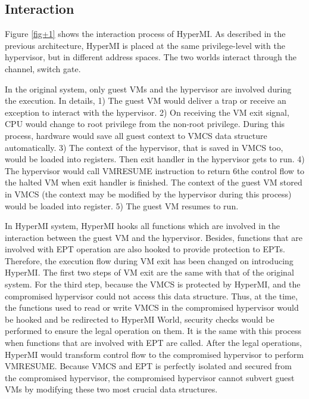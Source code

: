 \documentclass[conference]{IEEEtran}
\begin{document}
\iffalse
\subsection{Interaction} \label{IN}


Figure \ref{fig+1} shows the interaction process of HyperMI. 
As described in the previous architecture, HyperMI is placed at the same privilege-level with the hypervisor, but in different address spaces. The two worlds interact through the channel, switch gate.


In the original system, only guest VMs and the hypervisor are involved during the execution. In details, 1) The guest VM would deliver a trap or receive an exception to interact with the hypervisor. 2) On receiving the VM exit signal, CPU would change to root privilege from the non-root privilege. During this process, hardware would save all guest context to VMCS data structure automatically. 3) The context of the hypervisor, that is saved in VMCS too, would be loaded into registers. Then exit handler in the hypervisor gets to run. 4) The hypervisor would call VMRESUME instruction to return 6the control flow to the halted VM when exit handler is finished. The context of the guest VM stored in VMCS (the context may be modified by the hypervisor during this process) would be loaded into register. 5) The guest VM resumes to run.

In HyperMI system, HyperMI hooks all functions which are involved in the interaction between the guest VM and the hypervisor. Besides, functions that are involved with EPT operation are also hooked to provide protection to EPTs. Therefore, the execution flow during VM exit has been changed on introducing HyperMI. The first two steps of VM exit are the same with that of the original system. For the third step, because the VMCS is protected by HyperMI, and the compromised hypervisor could not access this data structure. Thus, at the time, the functions used to read or write VMCS in the compromised hypervisor would be hooked and be redirected to HyperMI World, security checks would be performed to ensure the legal operation on them. It is the same with this process when functions that are involved with EPT are called. 
After the legal operations, HyperMI would transform control flow to the compromised hypervisor to perform VMRESUME. Because VMCS and EPT is perfectly isolated and secured from the compromised hypervisor, the compromised hypervisor cannot subvert guest VMs by modifying these two most crucial data structures.
\end{document}
